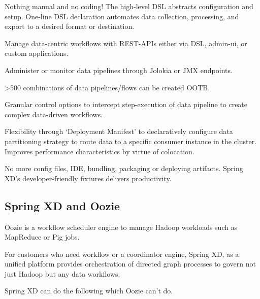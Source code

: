 \begin{itemize*}
\item Nothing manual and no coding! The high-level DSL abstracts configuration and setup. One-line DSL declaration automates data collection, processing, and export to a desired format or destination.
\item Manage data-centric workflows with REST-APIs either via DSL, admin-ui, or custom applications.
\item Administer or monitor data pipelines through Jolokia or JMX endpoints. 
\item >500 combinations of data pipelines/flows can be created OOTB.
\item Granular control options to intercept step-execution of data pipeline to create complex data-driven workflows.
\item Flexibility through `Deployment Manifest' to declaratively configure data partitioning strategy to route data to a specific consumer instance in the cluster. Improves performance characteristics by virtue of colocation.
\end{itemize*}

No more config files, IDE, bundling, packaging or deploying artifacts. Spring XD's developer-friendly fixtures delivers productivity. 

\subsection{Spring XD and Oozie}
Oozie is a workflow scheduler engine to manage Hadoop workloads such as MapReduce or Pig jobs. 

For customers who need workflow or a coordinator engine, Spring XD, as a unified platform provides orchestration of directed graph processes to govern not just Hadoop but any data workflows. 

Spring XD can do the following which Oozie can't do.

